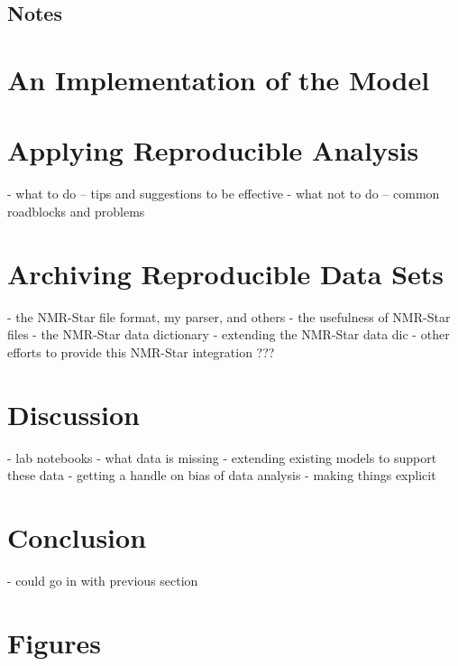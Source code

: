 \subsection{Notes}


\section{An Implementation of the Model}


\section{Applying Reproducible Analysis}
 - what to do -- tips and suggestions to be effective
 - what not to do -- common roadblocks and problems


\section{Archiving Reproducible Data Sets}
 - the NMR-Star file format, my parser, and others
 - the usefulness of NMR-Star files
 - the NMR-Star data dictionary
 - extending the NMR-Star data dic
 - other efforts to provide this NMR-Star integration ???


\section{Discussion}
 - lab notebooks
 - what data is missing
 - extending existing models to support these data
 - getting a handle on bias of data analysis
 - making things explicit


\section{Conclusion}
 - could go in with previous section


\clearpage
\section{Figures}

